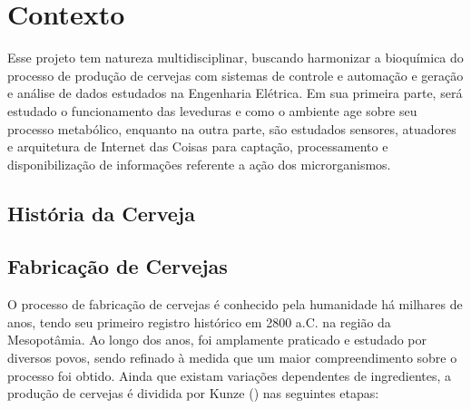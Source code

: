 \chapter{Contexto}

Esse projeto tem natureza multidisciplinar, buscando harmonizar a bioquímica do
processo de produção de cervejas com sistemas de controle e automação e
geração e análise de dados estudados na Engenharia Elétrica. Em sua primeira
parte, será estudado o funcionamento das leveduras e como o ambiente age sobre
seu processo metabólico, enquanto na outra parte, são estudados sensores,
atuadores e arquitetura de Internet das Coisas para captação, processamento e
disponibilização de informações referente a ação dos microrganismos.

\section{História da Cerveja}


\section{Fabricação de Cervejas}


O processo de fabricação de cervejas é conhecido pela 
humanidade há milhares de anos, tendo seu primeiro registro histórico em 2800 a.C.
na região da Mesopotâmia. Ao longo dos anos, foi amplamente praticado e estudado
por diversos povos, sendo refinado à medida que um maior compreendimento sobre
o processo foi obtido. Ainda que existam variações dependentes de ingredientes, a
produção de cervejas é dividida por Kunze () nas seguintes etapas: 

